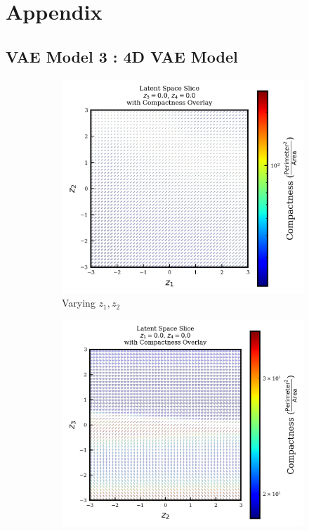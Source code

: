 \documentclass{article}
\begin{document}
\newpage{}
\section{Appendix}

\subsection{VAE Model 3 : 4D VAE Model}\label{model3_appendix}

\begin{figure}[H]
    \centering
    \begin{subfigure}{0.45\textwidth}
        \includegraphics[width=\linewidth]{figures/VAEmodels/model3/varying_z1_z2_fixed_z3=0.0_z4=0.0.png}
        \caption{Varying $z_1, z_2$}
    \end{subfigure}
    \hfill
    \begin{subfigure}{0.45\textwidth}
        \includegraphics[width=\linewidth]{figures/VAEmodels/model3/varying_z2_z3_fixed_z1=0.0_z4=0.0.png}

\end{subfigure}
\end{figure}
\end{document}
